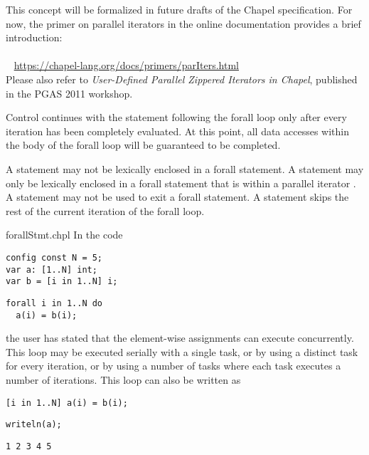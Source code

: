 This concept will be formalized in future drafts of the Chapel
specification. For now, the primer on parallel iterators
in the online documentation provides a brief introduction:
\\ %
\mbox{$$ $$ $$ $$ $$} %
\url{https://chapel-lang.org/docs/primers/parIters.html}
\\
Please also refer to \emph{User-Defined Parallel Zippered Iterators in
Chapel}, published in the PGAS 2011 workshop.

Control continues with the statement following the forall loop only
after every iteration has been completely evaluated.  At this point,
all data accesses within the body of the forall loop will be
guaranteed to be completed.

A  statement may not be lexically enclosed in a forall
statement. A  statement may only be lexically enclosed in
a forall statement that is within a parallel iterator
.
A  statement may not be used to exit a forall statement.
A  statement skips the rest of the current iteration
of the forall loop.

\begin{chapelexample}{forallStmt.chpl}
In the code
\begin{chapelpre}
\begin{verbatim}
config const N = 5;
var a: [1..N] int;
var b = [i in 1..N] i;
\end{verbatim}
\end{chapelpre}
\begin{chapel}
\begin{verbatim}
forall i in 1..N do
  a(i) = b(i);
\end{verbatim}
\end{chapel}
the user has stated that the element-wise assignments can execute
concurrently.  This loop may be executed serially with a single task,
or by using a distinct task for every iteration, or by using a number
of tasks where each task executes a number of iterations.  This loop
can also be written as
\begin{chapel}
\begin{verbatim}
[i in 1..N] a(i) = b(i);
\end{verbatim}
\end{chapel}
\begin{chapelpost}
\begin{verbatim}
writeln(a);
\end{verbatim}
\end{chapelpost}
\begin{chapeloutput}
\begin{verbatim}
1 2 3 4 5
\end{verbatim}
\end{chapeloutput}
\end{chapelexample}

